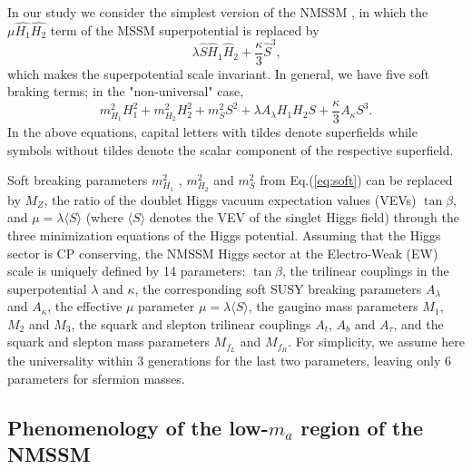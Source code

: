 \documentclass[aps,prl,twocolumn,nofootinbib,superscriptaddress]{revtex4}
\begin{document}
In our study we consider the simplest version of the NMSSM
\cite{Nilles:1982dy,Frere:1983ag,Ellis:1988er,%
Drees:1988fc,Ellwanger:1993hn,Ellwanger:1993xa,%
Elliott:1993bs,Pandita:1993tg,Ellwanger:1995ru,%
King:1995vk,Franke:1995tc,Ellwanger:1996gw},
in which the $\mu\widehat{H_1}\widehat{H_2}$ term of the 
MSSM superpotential is replaced by
\begin{equation}
\lambda  \widehat{S} \widehat{H}_1 \widehat{H}_2 + \frac{\kappa}{3}  \widehat{S}^3 \mbox{,}
\label{eq:superpot} 
\end{equation}
which makes the superpotential scale invariant.  In general, we have five
soft braking terms; in the "non-universal" case,
\begin{equation}
  m_{H_1}^2 H_1^2 + m_{H_2}^2 H_2^2  + m_{S}^2 S^2 
+ \lambda A_\lambda H_1 H_2 S +  \frac{\kappa}{3} A_\kappa S^3.
\label{eq:soft} 
\end{equation}
In the above equations, capital letters with tildes denote superfields
while symbols without tildes denote the scalar component of the respective
superfield.

Soft breaking parameters
$m_{H_1}^2$ , $m_{H_2}^2$  and $m_{S}^2$ 
from Eq.(\ref{eq:soft}) can  be replaced by
$M_Z$, the ratio  of the doublet Higgs vacuum expectation values (VEVs) $\tan\beta$,
and $\mu = \lambda \langle S \rangle$
(where $\langle S \rangle$ denotes the VEV of the singlet Higgs field)
through the three minimization equations of the Higgs potential.
Assuming that the Higgs sector is CP conserving,
the NMSSM Higgs sector at the Electro-Weak (EW) scale is uniquely defined
by 14 parameters:
$\tan\beta$,
the trilinear couplings in the superpotential $\lambda$ and $\kappa$, the
corresponding soft SUSY breaking parameters $A_\lambda$ and $A_\kappa$,
the effective $\mu$ parameter $\mu = \lambda \langle S \rangle$,
the gaugino mass parameters $M_1$, $M_2$ and $M_3$,
the squark and slepton trilinear couplings
$A_{t}$,  $A_{b}$ and  $A_\tau$,
and the squark and slepton mass parameters $M_{f_L}$ and $M_{f_R}$.
For simplicity, we assume here the
universality within 3 generations for the last two parameters, leaving
only 6 parameters for sfermion masses.

\subsection{Phenomenology of the low-$m_a$ region of the NMSSM}
\end{document}
